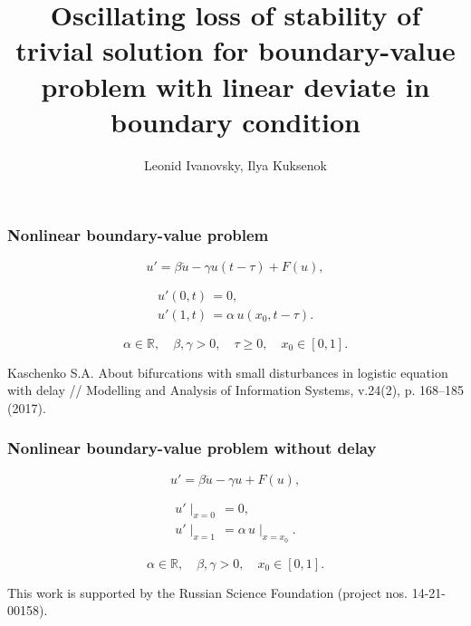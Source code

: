 \documentclass[fullscreen=true, unicode, bookmarks=false]{beamer}
\title[]{ Oscillating loss of stability of trivial solution for boundary-value problem with linear deviate in boundary condition }
\author[]{{\large Leonid Ivanovsky, Ilya Kuksenok}}
\date{}
\institute[]
{ postgraduate students }
\begin{document}
\begin{frame}
\titlepage
\end{frame} 

\begin{frame}
\frametitle{ Nonlinear boundary-value problem }
 
\begin{equation}\label{ivanovsky-eq1}
	u' = \beta \ddot{u} - \gamma u(t - \tau) + F(u),
\end{equation}	

\begin{gather}\label{ivanovsky-eq2}	
	u'(0, t) \, = 0, \\
	u'(1, t) \, = \alpha\,u(x_0, t-\tau). \nonumber
\end{gather}

$$ \alpha \in \mathbb{R}, \quad \beta, \gamma > 0, \quad \tau \geqslant 0, \quad x_0 \in [0, 1]. $$

\medskip
\pause

\begin{exampleblock}{}
{\large Kaschenko S.A. About bifurcations with small disturbances in logistic equation with delay // Modelling and Analysis of Information Systems, v.24(2), p. 168--185 (2017). }
\end{exampleblock}

\end{frame}

\begin{frame}
\frametitle{ Nonlinear boundary-value problem without delay}
 
\begin{equation}\label{ivanovsky-eq3}
	u' = \beta \ddot{u} - \gamma u + F(u),
\end{equation}	

\begin{gather}\label{ivanovsky-eq4}	
	u'\mid_{x=0} \, = 0, \\
	u'\mid_{x=1} \, = \alpha\,u\mid_{x=x_0}. \nonumber
\end{gather}

$$ \alpha \in \mathbb{R}, \quad \beta, \gamma > 0, \quad x_0 \in [0, 1]. $$

\medskip

\begin{exampleblock}{}
{\large This work is supported by the Russian Science Foundation (project nos. 14-21-00158). }
\end{exampleblock}

\end{frame}
\end{document}
